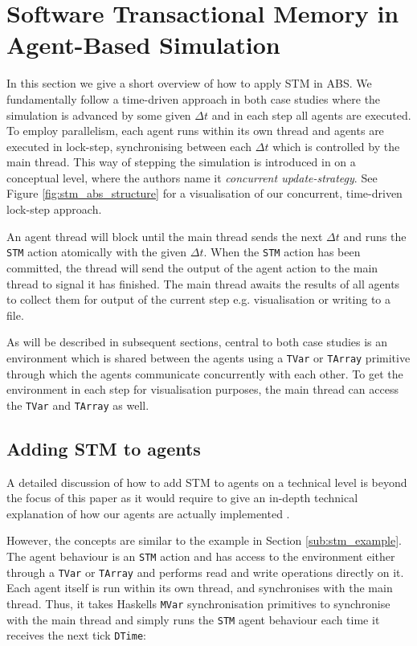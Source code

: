 \section{Software Transactional Memory in Agent-Based Simulation}
\label{sec:stm_abs}
In this section we give a short overview of how to apply STM in ABS. We fundamentally follow a time-driven approach in both case studies where the simulation is advanced by some given $\Delta t$ and in each step all agents are executed. To employ parallelism, each agent runs within its own thread and agents are executed in lock-step, synchronising between each $\Delta t$ which is controlled by the main thread. This way of stepping the simulation is introduced in \cite{thaler_art_2017} on a conceptual level, where the authors name it \textit{concurrent update-strategy}. See Figure \ref{fig:stm_abs_structure} for a visualisation of our concurrent, time-driven lock-step approach. 

An agent thread will block until the main thread sends the next $\Delta t$ and runs the \texttt{STM} action atomically with the given $\Delta t$. When the \texttt{STM} action has been committed, the thread will send the output of the agent action to the main thread to signal it has finished. The main thread awaits the results of all agents to collect them for output of the current step e.g. visualisation or writing to a file.

As will be described in subsequent sections, central to both case studies is an environment which is shared between the agents using a \texttt{TVar} or \texttt{TArray} primitive through which the agents communicate concurrently with each other. To get the environment in each step for visualisation purposes, the main thread can access the \texttt{TVar} and \texttt{TArray} as well. 

\subsection{Adding STM to agents}
A detailed discussion of how to add STM to agents on a technical level is beyond the focus of this paper as it would require to give an in-depth technical explanation of how our agents are actually implemented \cite{thaler_pure_2018}.

However, the concepts are similar to the example in Section \ref{sub:stm_example}. The agent behaviour is an \texttt{STM} action and has access to the environment either through a \texttt{TVar} or \texttt{TArray} and performs read and write operations directly on it. Each agent itself is run within its own thread, and synchronises with the main thread. Thus, it takes Haskells \texttt{MVar} synchronisation primitives to synchronise with the main thread and simply runs the \texttt{STM} agent behaviour each time it receives the next tick \texttt{DTime}: \\ %

